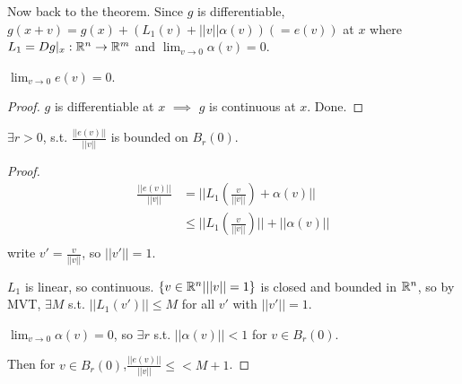 \documentclass[a4paper]{article}
\begin{document}
Now back to the theorem. Since $g$ is differentiable, $g(x+v)=g(x)+(L_1(v)+||v||\alpha(v))(=e(v))$ at $x$ where $L_1 = Dg|_x:\mathbb{R}^n \to \mathbb{R}^m$ and $\lim_{v \to 0}\alpha(v)=0$.

\begin{lemma}
$\lim_{v \to 0} e(v)=0$.
\begin{proof}
$g$ is differentiable at $x$ $\implies$ $g$ is continuous at $x$. Done.
\end{proof}
\end{lemma}

\begin{lemma}
$\exists r>0$, s.t. $\frac{||e(v)||}{||v||}$ is bounded on $B_r(0)$.
\begin{proof}
\begin{equation*}
\begin{aligned}
\frac{||e(v)||}{||v||} &= ||L_1(\frac{v}{||v||})+\alpha(v)||\\
&\leq ||L_1(\frac{v}{||v||})|| + ||\alpha(v)||\\
\end{aligned}
\end{equation*}
write $v'=\frac{v}{||v||}$, so $||v'||=1$.

$L_1$ is linear, so continuous. $\{v \in \mathbb{R}^n | ||v||=1\}$ is closed and bounded in $\mathbb{R}^n$, so by MVT, $\exists M$ s.t. $||L_1(v')||\leq M$ for all $v'$ with $||v'||=1$.

$\lim_{v\to 0}\alpha(v) = 0$, so $\exists r$ s.t. $||\alpha(v)||<1$ for $v \in B_r(0)$.

Then for $v \in B_r(0)$,$\frac{||e(v)||}{||v||} \leq <M+1$.
\end{proof}
\end{lemma}
\end{document}
